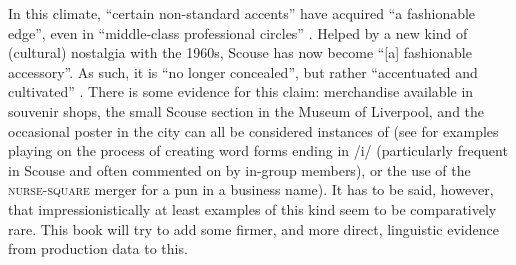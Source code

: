 In this climate, ``certain non-standard accents'' have acquired ``a fashionable edge'', even in ``middle-class professional circles'' \parencite[58]{belchem2006d}.
Helped by a new kind of (cultural) nostalgia with the 1960s, Scouse has now become ``[a] fashionable accessory''.
As such, it is ``no longer concealed'', but rather ``accentuated and cultivated'' \citep[58]{belchem2006d}.
There is some evidence for this claim: merchandise available in souvenir shops, the small Scouse section in the Museum of Liverpool, and the occasional poster in the city can all be considered instances of  (see  for examples playing on the process of creating word forms ending in /i/ (particularly frequent in Scouse and often commented on by in-group members), or the use of the \textsc{nurse}-\textsc{square} merger for a pun in a business name).
It has to be said, however, that impressionistically at least examples of this kind seem to be comparatively rare.
This book will try to add some firmer, and more direct, linguistic evidence from production data to this.

